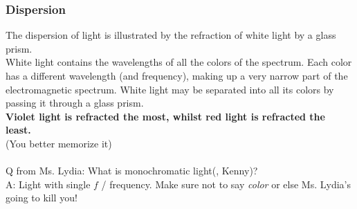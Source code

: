 \documentclass[a4paper,12pt]{article}
\begin{document}
\subsubsection{Dispersion}
The dispersion of light is illustrated by the refraction of white light by a glass prism.\\
White light contains the wavelengths of all the colors of the spectrum. Each color has a different wavelength (and frequency), making up a very narrow part of the electromagnetic spectrum. White light may be separated into all its colors by passing it through a glass prism.\\
\textbf{Violet light is refracted the most, whilst red light is refracted the least.} \\(You better memorize it)\\\\
Q from Ms. Lydia: What is monochromatic light(, Kenny)?\\
A: Light with single \(f\) / frequency. Make sure not to say \textit{color} or else Ms. Lydia's going to kill you!
\\
\end{document}
